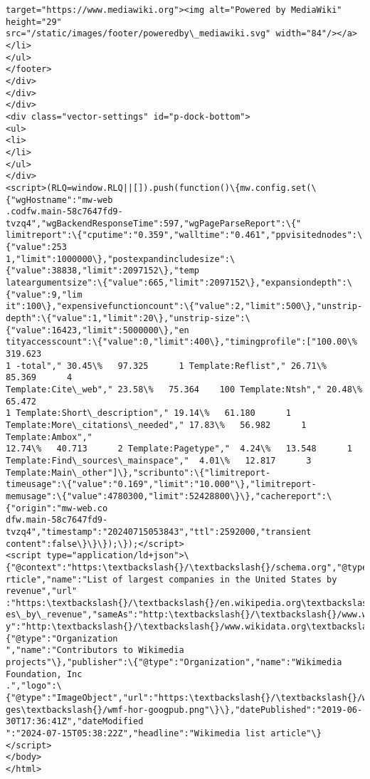\documentclass[11pt]{article}
\begin{document}
\begin{Verbatim}[commandchars=\\\{\}]
target="https://www.mediawiki.org"><img alt="Powered by MediaWiki" height="29"
src="/static/images/footer/poweredby\_mediawiki.svg" width="84"/></a></li>
</ul>
</footer>
</div>
</div>
</div>
<div class="vector-settings" id="p-dock-bottom">
<ul>
<li>
</li>
</ul>
</div>
<script>(RLQ=window.RLQ||[]).push(function()\{mw.config.set(\{"wgHostname":"mw-web
.codfw.main-58c7647fd9-tvzq4","wgBackendResponseTime":597,"wgPageParseReport":\{"
limitreport":\{"cputime":"0.359","walltime":"0.461","ppvisitednodes":\{"value":253
1,"limit":1000000\},"postexpandincludesize":\{"value":38838,"limit":2097152\},"temp
lateargumentsize":\{"value":665,"limit":2097152\},"expansiondepth":\{"value":9,"lim
it":100\},"expensivefunctioncount":\{"value":2,"limit":500\},"unstrip-
depth":\{"value":1,"limit":20\},"unstrip-size":\{"value":16423,"limit":5000000\},"en
tityaccesscount":\{"value":0,"limit":400\},"timingprofile":["100.00\%  319.623
1 -total"," 30.45\%   97.325      1 Template:Reflist"," 26.71\%   85.369      4
Template:Cite\_web"," 23.58\%   75.364    100 Template:Ntsh"," 20.48\%   65.472
1 Template:Short\_description"," 19.14\%   61.180      1
Template:More\_citations\_needed"," 17.83\%   56.982      1 Template:Ambox","
12.74\%   40.713      2 Template:Pagetype","  4.24\%   13.548      1
Template:Find\_sources\_mainspace","  4.01\%   12.817      3
Template:Main\_other"]\},"scribunto":\{"limitreport-
timeusage":\{"value":"0.169","limit":"10.000"\},"limitreport-
memusage":\{"value":4780300,"limit":52428800\}\},"cachereport":\{"origin":"mw-web.co
dfw.main-58c7647fd9-tvzq4","timestamp":"20240715053843","ttl":2592000,"transient
content":false\}\}\});\});</script>
<script type="application/ld+json">\{"@context":"https:\textbackslash{}/\textbackslash{}/schema.org","@type":"A
rticle","name":"List of largest companies in the United States by revenue","url"
:"https:\textbackslash{}/\textbackslash{}/en.wikipedia.org\textbackslash{}/wiki\textbackslash{}/List\_of\_largest\_companies\_in\_the\_United\_Stat
es\_by\_revenue","sameAs":"http:\textbackslash{}/\textbackslash{}/www.wikidata.org\textbackslash{}/entity\textbackslash{}/Q1860802","mainEntit
y":"http:\textbackslash{}/\textbackslash{}/www.wikidata.org\textbackslash{}/entity\textbackslash{}/Q1860802","author":\{"@type":"Organization
","name":"Contributors to Wikimedia
projects"\},"publisher":\{"@type":"Organization","name":"Wikimedia Foundation, Inc
.","logo":\{"@type":"ImageObject","url":"https:\textbackslash{}/\textbackslash{}/www.wikimedia.org\textbackslash{}/static\textbackslash{}/ima
ges\textbackslash{}/wmf-hor-googpub.png"\}\},"datePublished":"2019-06-30T17:36:41Z","dateModified
":"2024-07-15T05:38:22Z","headline":"Wikimedia list article"\}</script>
</body>
</html>
    \end{Verbatim}
\end{document}
